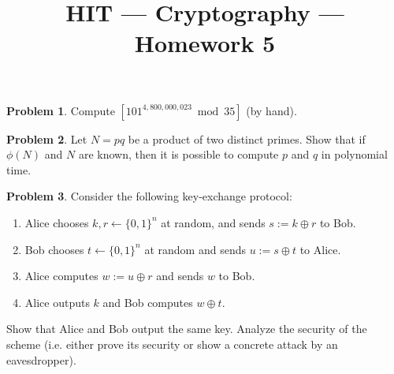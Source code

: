 \documentclass[11pt]{article}
\title{HIT --- Cryptography --- Homework 5}
\theoremstyle{definition}
\newtheorem{problem}{Problem}
\begin{document}
\maketitle


\begin{problem}
Compute $[101^{4,800,000,023} \bmod 35]$ (by hand).
\end{problem}

\begin{problem}
Let $N=pq$ be a product of two distinct primes. Show that if $\phi(N)$ and $N$ are known, then it is possible to compute $p$ and $q$ in polynomial time.
\end{problem}

\begin{problem}
Consider the following key-exchange protocol:
\begin{enumerate}
\item Alice chooses $k,r \gets \{0,1\}^n$ at random, and sends $s:=k\oplus r$ to Bob.
\item Bob chooses $t \gets \{0,1\}^n$ at random and sends $u := s\oplus t$ to Alice.
\item Alice computes $w := u\oplus r$ and sends $w$ to Bob.
\item Alice outputs $k$ and Bob computes $w \oplus t$.
\end{enumerate}
Show that Alice and Bob output the same key. Analyze the security of the scheme (i.e. either prove its security or show a concrete attack by an eavesdropper).
\end{problem}
\end{document}

